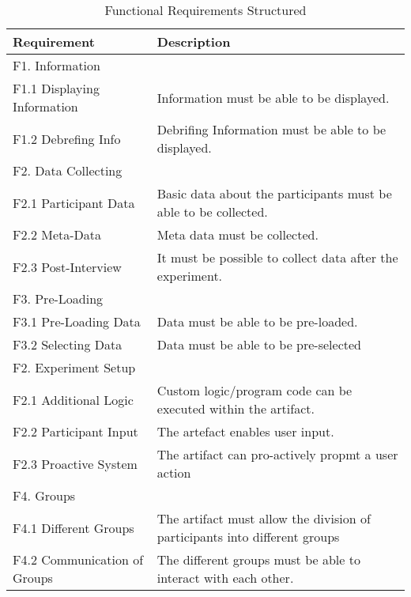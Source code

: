 \begin{table}[htbp]
    \centering
    \begin{tabular}{L{0.35\textwidth}L{0.59\textwidth}}
    \hline
    Requirement                     & Description \\ \hline
    F1. Information                 &             \\ \hline
    F1.1 Displaying Information     & Information must be able to be displayed.            \\
    F1.2 Debrefing Info             & Debrifing Information must be able to be displayed.           \\ \hline
    F2. Data Collecting             &             \\ \hline
    F2.1 Participant Data           & Basic data about the participants must be able to be collected.           \\
    F2.2 Meta-Data                  & Meta data must be collected.            \\
    F2.3 Post-Interview             & It must be possible to collect data after the experiment.            \\ \hline
    F3. Pre-Loading                 &             \\ \hline
    F3.1 Pre-Loading Data           & Data must be able to be pre-loaded.            \\
    F3.2 Selecting Data             & Data must be able to be pre-selected            \\ \hline
    F2. Experiment Setup            &             \\ \hline
    F2.1 Additional Logic           & Custom logic/program code can be executed within the artifact.            \\
    F2.2 Participant Input          & The artefact enables user input.            \\
    F2.3 Proactive System           & The artifact can pro-actively propmt a user action           \\ \hline
    F4. Groups                      &             \\ \hline
    F4.1 Different Groups           & The artifact must allow the division of participants into different groups            \\
    F4.2 Communication of Groups    & The different groups must be able to interact with each other.            \\ \hline
    \end{tabular}
    \caption[Functional Requirements Structured]{Functional Requirements Structured}\label{tab:FuncRequirementsCat}
    \end{table}


